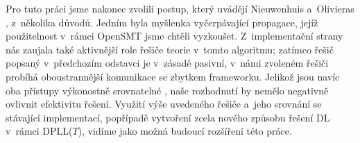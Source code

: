 Pro tuto práci jsme nakonec zvolili postup, který uvádějí Nieuwenhuis a~Olivieras \cite{Nieuwenhuis05}, z~několika důvodů. Jedním byla myšlenka vyčerpávající propagace, jejíž použitelnost v~rámci OpenSMT jsme chtěli vyzkoušet. Z~implementační strany nás zaujala také aktivnější role řešiče teorie v~tomto algoritmu; zatímco řešič popsaný v~předchozím odstavci je v~zásadě pasivní, v~námi zvoleném řešiči probíhá oboustrannější komunikace se zbytkem frameworku. Jelikož jsou navíc oba přístupy výkonostně srovnatelné \cite{Wang05}, naše rozhodnutí by nemělo negativně ovlivnit efektivitu řešení. Využití výše uvedeného řešiče a~jeho srovnání se stávající implementací, popřípadě vytvoření zcela nového způsobu řešení DL v~rámci DPLL($T$), vidíme jako možná budoucí rozšíření této práce.
